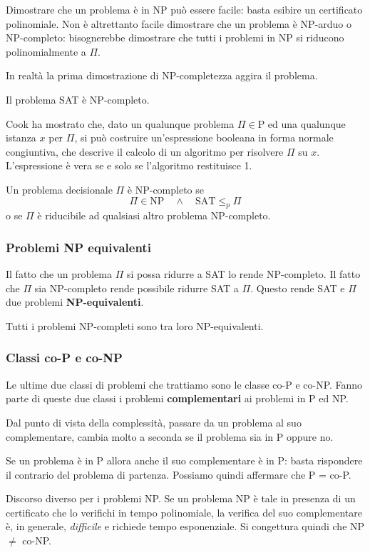 Dimostrare che un problema \`e in NP pu\`o essere facile: basta esibire un certificato polinomiale. Non \`e altrettanto
facile dimostrare che un problema \`e NP-arduo o NP-completo: bisognerebbe dimostrare che tutti i problemi in NP si
riducono polinomialmente a $\Pi$.

In realt\`a la prima dimostrazione di NP-completezza aggira il problema.

\begin{theorem}[Cook]
	Il problema SAT \`e NP-completo.
\end{theorem}

Cook ha mostrato che, dato un qualunque problema $\Pi \in \text{P}$ ed una qualunque istanza $x$ per $\Pi$, si pu\`o
costruire un'espressione booleana in forma normale congiuntiva, che descrive il calcolo di un algoritmo per risolvere
$\Pi$ su $x$. L'espressione \`e vera se e solo se l'algoritmo restituisce 1.

\begin{theorem}
	Un problema decisionale $\Pi$ \`e NP-completo se
	\[ \Pi \in \text{NP} \quad \wedge \quad \text{SAT} \leq_p \Pi \]
	o se $\Pi$ \`e riducibile ad qualsiasi altro problema NP-completo.
\end{theorem}

\subsubsection{Problemi NP equivalenti}
Il fatto che un problema $\Pi$ si possa ridurre a SAT lo rende NP-completo. Il fatto che $\Pi$ sia NP-completo rende
possibile ridurre SAT a $\Pi$. Questo rende SAT e $\Pi$ due problemi \textbf{NP-equivalenti}.

\begin{theorem}
	Tutti i problemi NP-completi sono tra loro NP-equivalenti.
\end{theorem}

\subsubsection{Classi co-P e co-NP}
Le ultime due classi di problemi che trattiamo sono le classe co-P e co-NP. Fanno parte di queste due classi i problemi
\textbf{complementari} ai problemi in P ed NP.

Dal punto di vista della complessit\`a, passare da un problema al suo complementare, cambia molto a seconda se il problema
sia in P oppure no.

Se un problema \`e in P allora anche il suo complementare \`e in P: basta rispondere il contrario del problema di
partenza. Possiamo quindi affermare che P = co-P.

Discorso diverso per i problemi NP. Se un problema NP \`e tale in presenza di un certificato che lo verifichi in tempo
polinomiale, la verifica del suo complementare \`e, in generale, \emph{difficile} e richiede tempo esponenziale. Si
congettura quindi che NP $\neq$ co-NP.